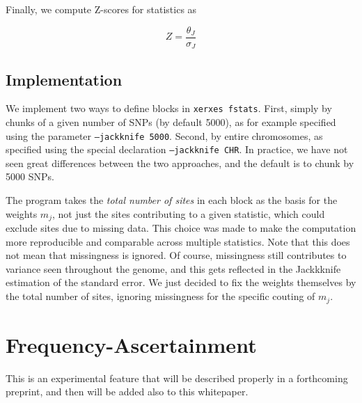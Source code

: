 \documentclass{article}
\begin{document}
Finally, we compute Z-scores for statistics as

$$Z=\frac{\theta_J}{\sigma_J}$$

\subsection{Implementation}

We implement two ways to define blocks in \texttt{xerxes fstats}. First, simply by chunks of a given number of SNPs (by default 5000), as for example specified using the parameter \texttt{--jackknife 5000}. Second, by entire chromosomes, as specified using the special declaration \texttt{--jackknife CHR}. In practice, we have not seen great differences between the two approaches, and the default is to chunk by 5000 SNPs.

The program takes the \emph{total number of sites} in each block as the basis for the weights $m_j$, not just the sites contributing to a given statistic, which could exclude sites due to missing data. This choice was made to make the computation more reproducible and comparable across multiple statistics. Note that this does not mean that missingness is ignored. Of course, missingness still contributes to variance seen throughout the genome, and this gets reflected in the Jackkknife estimation of the standard error. We just decided to fix the weights themselves by the total number of sites, ignoring missingness for the specific couting of $m_j$.

\section{Frequency-Ascertainment}
This is an experimental feature that will be described properly in a forthcoming preprint, and then will be added also to this whitepaper.

\printbibliography
\end{document}
